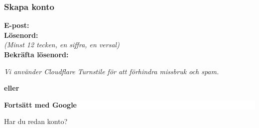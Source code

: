 \documentclass[10pt]{beamer}
\begin{document}
\begin{frame}[label=register]
  \frametitle{Skapa konto}

  \vspace{0.5cm}
  \begin{minipage}{0.9\textwidth}
    \small
    \textbf{E-post:} \underline{\hspace{6.5cm}} \\
    \textbf{Lösenord:} \underline{\hspace{6.5cm}} \\
    \footnotesize\textit{(Minst 12 tecken, en siffra, en versal)} \\
    \textbf{Bekräfta lösenord:} \underline{\hspace{6.5cm}} \\

    \vspace{0.8cm}
    
    \vspace{0.3cm}
    \footnotesize
    \textit{Vi använder Cloudflare Turnstile för att förhindra missbruk och spam.}

    \vspace{1.2cm}
    \centering
    
    \vspace{1.2cm}
    \textcolor{warmbrown}{\textbf{eller}}
    
    \vspace{0.6cm}
    \colorbox{white}{%
      \parbox{5cm}{\centering\footnotesize\textbf{Fortsätt med Google}}%
    }
  \end{minipage}
  
  \vspace{0.8cm}
  \begin{center}
    \footnotesize
    Har du redan konto? \hyperlink{login}{}
  \end{center}
\end{frame}
\end{document}
